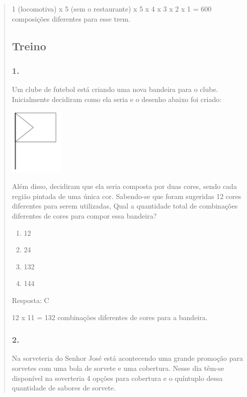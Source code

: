 \begin{enumerate}
\begin{escolha}
\begin{enumerate}
\begin{itemize}
\begin{itemize}
\begin{escolha}
\begin{quote}
\begin{escolha}
{1 (locomotiva) x 5 (sem o restaurante) x 5 x 4 x 3 x 2 x 1 = 600
composições diferentes para esse trem.

\subsection{Treino}\label{treino-10}

\subsubsection{1.}\label{section-140}

Um clube de futebol está criando uma nova bandeira para o clube.
Inicialmente decidiram como ela seria e o desenho abaixo foi criado:

\includegraphics[width=1.02511in,height=1.26282in]{media/image140.png}

Além disso, decidiram que ela seria composta por duas cores, sendo cada
região pintada de uma única cor. Sabendo-se que foram sugeridas 12 cores
diferentes para serem utilizadas, Qual a quantidade total de combinações
diferentes de cores para compor essa bandeira?

\begin{enumerate}
\def\labelenumi{\alph{enumi})}
\item
  12
\item
  24
\item
  132
\item
  144
\end{enumerate}

Resposta: C

12 x 11 = 132 combinações diferentes de cores para a bandeira.

\subsubsection{2.}\label{section-141}

Na sorveteria do Senhor José está acontecendo uma grande promoção para
sorvetes com uma bola de sorvete e uma cobertura. Nesse dia têm-se
disponível na soverteria 4 opções para cobertura e o quíntuplo dessa
quantidade de sabores de sorvete.

}
\end{escolha}
\end{quote}
\end{escolha}
\end{itemize}
\end{itemize}
\end{enumerate}
\end{escolha}
\end{enumerate}
